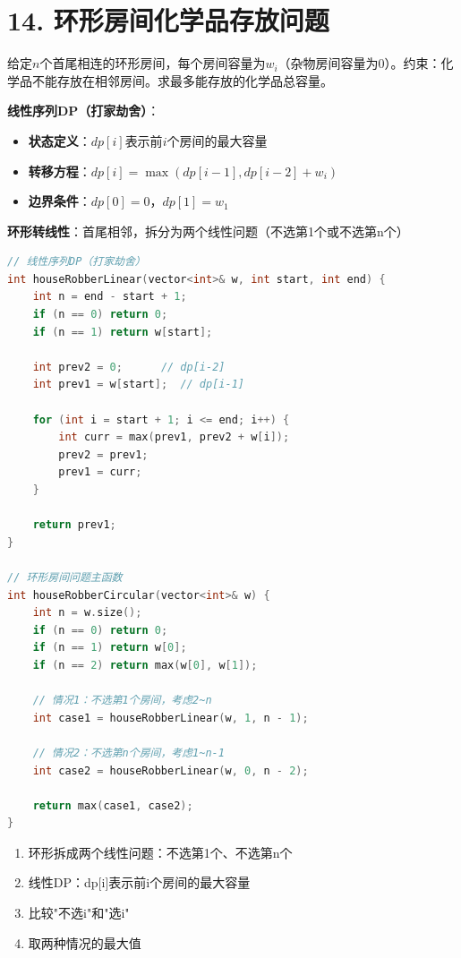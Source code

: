 \section*{14. 环形房间化学品存放问题}

给定$n$个首尾相连的环形房间，每个房间容量为$w_i$（杂物房间容量为0）。约束：化学品不能存放在相邻房间。求最多能存放的化学品总容量。

\textbf{线性序列DP（打家劫舍）}：
\begin{itemize}
    \item \textbf{状态定义}：$dp[i]$表示前$i$个房间的最大容量
    \item \textbf{转移方程}：$dp[i] = \max(dp[i-1], dp[i-2] + w_i)$
    \item \textbf{边界条件}：$dp[0] = 0$，$dp[1] = w_1$
\end{itemize}

\textbf{环形转线性}：首尾相邻，拆分为两个线性问题（不选第1个或不选第n个）

\begin{lstlisting}[language=C++, style=cppstyle]
// 线性序列DP（打家劫舍）
int houseRobberLinear(vector<int>& w, int start, int end) {
    int n = end - start + 1;
    if (n == 0) return 0;
    if (n == 1) return w[start];

    int prev2 = 0;      // dp[i-2]
    int prev1 = w[start];  // dp[i-1]

    for (int i = start + 1; i <= end; i++) {
        int curr = max(prev1, prev2 + w[i]);
        prev2 = prev1;
        prev1 = curr;
    }

    return prev1;
}

// 环形房间问题主函数
int houseRobberCircular(vector<int>& w) {
    int n = w.size();
    if (n == 0) return 0;
    if (n == 1) return w[0];
    if (n == 2) return max(w[0], w[1]);

    // 情况1：不选第1个房间，考虑2~n
    int case1 = houseRobberLinear(w, 1, n - 1);

    // 情况2：不选第n个房间，考虑1~n-1
    int case2 = houseRobberLinear(w, 0, n - 2);

    return max(case1, case2);
}
\end{lstlisting}


\begin{enumerate}
    \item 环形拆成两个线性问题：不选第1个、不选第n个
    \item 线性DP：dp[i]表示前i个房间的最大容量
    \item 比较"不选i"和"选i"
    \item 取两种情况的最大值
\end{enumerate}

